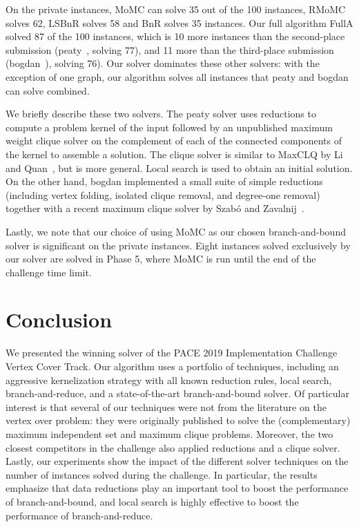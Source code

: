 \documentclass[twoside,leqno,twocolumn]{article}
\newcommand{\AlgName}[1]{\textsf{#1}}
\begin{document}
On the private instances, \AlgName{MoMC} can solve 35 out of the 100 instances, \AlgName{RMoMC} solves 62, \AlgName{LSBnR} solves 58 and \AlgName{BnR} solves 35 instances.
Our full algorithm \AlgName{FullA} solved 87 of the 100 instances, which is 10 more instances than the second-place submission (\textsf{peaty}~\cite{james_trimble_2019_3082356}, solving 77), and 11 more than the third-place submission (\textsf{bogdan}~\cite{zbogdan_2019_3228802}), solving 76). Our solver dominates these other solvers: with the exception of one graph, our algorithm solves all instances that \textsf{peaty} and \textsf{bogdan} can solve combined. 

We briefly describe these two solvers. The \textsf{peaty} solver uses reductions to compute a problem kernel of the input followed by an unpublished maximum weight clique solver on the complement of each of the connected components of the kernel to assemble a solution. The clique solver is similar to MaxCLQ by Li and Quan~\cite{DBLP:conf/aaai/LiQ10}, but is more general. Local search is used to obtain an initial solution. On the other hand, \textsf{bogdan} implemented a small suite of simple reductions (including vertex folding, isolated clique removal, and degree-one removal) together with a recent maximum clique solver by Szab\'o and Zavalnij~\cite{szabo2018different}. 

Lastly, we note that our choice of using MoMC as our chosen branch-and-bound solver is significant on the private instances. Eight instances solved exclusively by our solver are solved in Phase 5, where MoMC is run until the end of the challenge time limit.
\section{Conclusion}
We presented the winning solver of the PACE 2019 Implementation Challenge Vertex Cover Track. Our algorithm uses a portfolio of techniques, including an aggressive kernelization strategy with all known reduction rules, local search, branch-and-reduce, and a state-of-the-art branch-and-bound solver. Of particular interest is that several of our techniques were not from the literature on the vertex over problem: they were originally published to solve the (complementary) maximum independent set and maximum clique problems. Moreover, the two closest competitors in the challenge also applied reductions and a clique solver. Lastly, our experiments show the impact of the different solver techniques on the number of instances solved during the challenge. In particular, the results emphasize that data reductions play an important tool to boost the performance of branch-and-bound, and local search is highly effective to boost the performance of branch-and-reduce.
\end{document}
